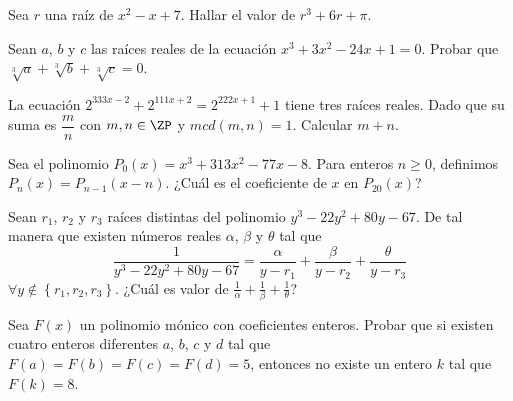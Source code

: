     \begin{section-problem}
        Sea $r$ una raíz de $x^2 - x + 7$. Hallar el valor de $r^3 + 6r + \pi$.
    \end{section-problem}

    \begin{section-problem}
        Sean $a$, $b$ y $c$ las raíces reales de la ecuación $x^3 + 3x^2 - 24x + 1 = 0$.
        Probar que $\sqrt[3]{a} + \sqrt[3]{b} + \sqrt[3]{c} = 0$.
    \end{section-problem}

    \begin{section-problem}
        La ecuación $2^{333x - 2} + 2^{111x + 2} = 2^{222x + 1} + 1$ tiene tres raíces reales.
        Dado que su suma es $\dfrac{m}{n}$ con $m, n \in \ZP$ y $mcd(m, n) = 1$.
        Calcular $m + n$.
    \end{section-problem}

    \begin{section-problem}
        Sea el polinomio $P_0(x) = x^3 + 313x^2 - 77x - 8$.
        Para enteros $n \geq 0$, definimos $P_n(x) = P_{n - 1}(x - n)$.
        ¿Cuál es el coeficiente de $x$ en $P_{20}(x)$?
    \end{section-problem}

    \begin{section-problem}
        Sean $r_1$, $r_2$ y $r_3$ raíces distintas del polinomio $y^3 - 22 y^2 + 80 y - 67$.
        De tal manera que existen números reales $\alpha$, $\beta$ y $\theta$ tal que
        \[\frac{1}{y^3 - 22 y^2 + 80 y - 67} = \frac{\alpha}{y - r_1} + \frac{\beta}{y - r_2} + \frac{\theta}{y - r_3}\]
        $\forall y \notin \left\{ r_1, r_2, r_3 \right\}$.
        ¿Cuál es valor de $\frac{1}{\alpha} + \frac{1}{\beta} + \frac{1}{\theta}$?
    \end{section-problem}

    \begin{section-problem}
        Sea $F(x)$ un polinomio mónico con coeficientes enteros.
        Probar que si existen cuatro enteros diferentes $a$, $b$, $c$ y $d$ tal que $F(a) = F(b) = F(c)  = F(d) = 5$,
        entonces no existe un entero $k$ tal que $F(k) = 8$.
    \end{section-problem}


